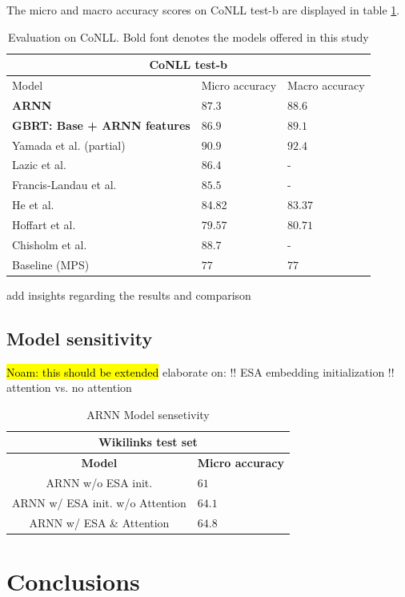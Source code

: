 \documentclass[11pt]{article}
\begin{document}
	The micro and macro accuracy scores on CoNLL test-b are displayed in table \ref{tab:a}. 

		
	\begin{table}[h]
		\begin{center}
			\begin{tabular}{|p{3.5cm}| p{1.5cm} p{1.5cm}|}
				\hline \multicolumn{3}{|c|}{CoNLL test-b} \\
				\hline Model & Micro     accuracy & Macro     accuracy \\ \hline
				\bf ARNN  & \bf $87.3$ & \bf $88.6$ \\
				\bf GBRT: Base + ARNN features & \bf $86.9$ & \bf $89.1$ \\
				Yamada et al. (partial) & $90.9$ & $92.4$ \\
				Lazic et al. & $86.4$ & - \\
				Francis-Landau et al. & $85.5$ & - \\
				He et al. & 84.82 & $83.37$ \\	
				Hoffart et al. & $79.57$ & $80.71$ \\
				Chisholm et al. & $88.7$ & - \\			
				Baseline (MPS) & $77$ & $77$ \\
				\hline
			\end{tabular}
		\end{center}
		\caption{\label{tab:a} Evaluation on CoNLL. Bold font denotes the models offered in this study}
	\end{table}

	
	add insights regarding the results and comparison 
	\subsection{Model sensitivity}
	
	\hl{Noam: this should be extended} elaborate on: \newline
	!! ESA embedding initialization \newline
	!! attention vs. no attention\newline
	
	\begin{table}[h]
	\begin{center}
		\begin{tabular}{|c| p{1.5cm}|}
			\hline \multicolumn{2}{|c|}{Wikilinks test set} \\
			\hline \bf Model & \bf Micro     accuracy  \\ \hline
			ARNN w/o ESA init. & $61$ \\
			ARNN w/ ESA init. w/o Attention & $64.1$ \\
			ARNN w/ ESA \& Attention & $64.8$ \\ 
			\hline
		\end{tabular}
	\end{center}
	\caption{\label{tab:c} ARNN Model sensetivity}
	\end{table}

	\section{Conclusions}
	
	
	
	
\end{document}
